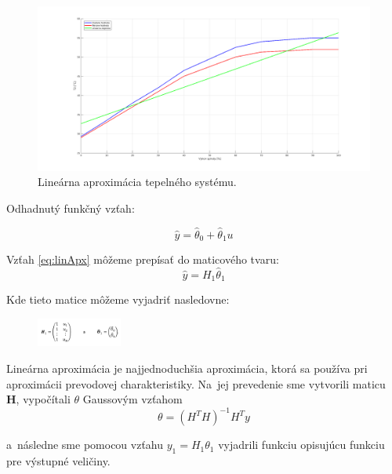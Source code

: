 \documentclass{article}
\begin{document}
\begin{figure}[!htbp]
	\begin{center}
		\includegraphics[width=\textwidth]{include/linearna_regresia.png}
	\end{center}
	\caption{Lineárna aproximácia tepelného systému.}
	\label{fig:linApx}
\end{figure}

Odhadnutý funkčný vzťah:

\begin{equation}
	\hat{y} = \hat{\theta}_0 + \hat{\theta}_1u
	\label{eq:linApx}
\end{equation}

Vzťah \ref{eq:linApx} môžeme prepísať do maticového tvaru:
\begin{equation}
	\hat{y} = H_1\hat{\theta}_1
	\label{eq:linApx2}
\end{equation}

Kde tieto matice môžeme vyjadriť nasledovne:

\begin{figure}[!htbp]
	\begin{center}
		\includegraphics[width=0.25\textwidth]{include/defHandTheta.png}
	\end{center}
\end{figure}

Lineárna aproximácia je najjednoduchšia aproximácia, ktorá sa používa pri aproximácii prevodovej
charakteristiky. Na~jej prevedenie sme vytvorili maticu \textbf{H}, vypočítali
\(\theta\) Gaussovým vzťahom
\begin{equation}
	\theta = (H^TH)^{-1}H^Ty
	\label{eq:gausEq}
\end{equation}

a~následne sme pomocou vzťahu \(y_1 = H_1\theta_1\) vyjadrili funkciu opisujúcu funkciu pre výstupné
veličiny.
\end{document}
